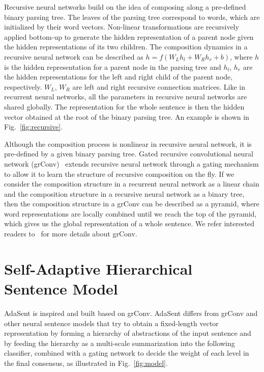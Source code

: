 \documentclass{article}
\theoremstyle{definition}
\begin{document}
Recursive neural networks build on the idea of composing along a pre-defined binary parsing tree. The leaves of the parsing tree correspond to words, which are initialized by their word vectors. Non-linear transformations are recursively applied bottom-up to generate the hidden representation of a parent node given the hidden representations of its two children. The composition dynamics in a recursive neural network can be described as $h = f(W_Lh_l + W_R h_r + b)$, where $h$ is the hidden representation for a parent node in the parsing tree and $h_l$, $h_r$ are the hidden representations for the left and right child of the parent node, respectively. $W_L$, $W_R$ are left and right recursive connection matrices. Like in recurrent neural networks, all the parameters in recursive neural networks are shared globally. The representation for the whole sentence is then the hidden vector obtained at the root of the binary parsing tree. An example is shown in Fig.~\ref{fig:recursive}.

Although the composition process is nonlinear in recursive neural network, it is pre-defined by a given binary parsing tree. Gated recursive convolutional neural network (grConv)~\cite{cho2014properties} extends recursive neural network through a gating mechanism to allow it to learn the structure of recursive composition on the fly. If we consider the composition structure in a recurrent neural network as a linear chain and the composition structure in a recursive neural network as a binary tree, then the composition structure in a grConv can be described as a pyramid, where word representations are locally combined until we reach the top of the pyramid, which gives us the global representation of a whole sentence. We refer interested readers to~\cite{cho2014properties} for more details about grConv.

\section{Self-Adaptive Hierarchical Sentence Model}
\label{sec:adasent}
AdaSent is inspired and built based on grConv. AdaSent differs from grConv and other neural sentence models that try to obtain a fixed-length vector representation by forming a hierarchy of abstractions of the input sentence and by feeding the hierarchy as a multi-scale summarization into the following classifier, combined with a gating network to decide the weight of each level in the final consensus, as illustrated in Fig.~\ref{fig:model}. 
\end{document}
